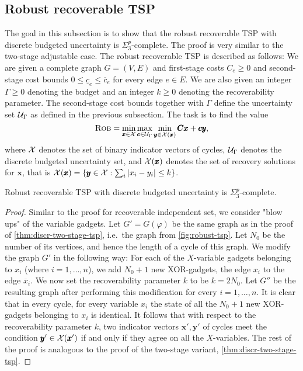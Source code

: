 \subsection{Robust recoverable TSP}
\label{subsec:rec-tsp}

The goal in this subsection is to show that the robust recoverable TSP with discrete budgeted uncertainty is $\Sigma_3^p$-complete. 
The proof is very similar to the two-stage adjustable case. 
The robust recoverable TSP is described as follows: 
We are given a complete graph $G = (V,E)$ and first-stage costs $C_e \geq 0$ and second-stage cost bounds $0 \leq \underline{c}_e \leq \overline{c}_e$ for every edge $e \in E$. 
We are also given an integer $\Gamma \geq 0$ denoting the budget and an integer $k \geq 0$ denoting the recoverability parameter. 
The second-stage cost bounds together with $\Gamma$ define the uncertainty set $\mathcal{U}_\Gamma$ as defined in the previous subsection.
The task is to find the value 
\begin{equation}
 \textsc{Rob} = \min_{\pmb x  \in \mathcal{X}} \max_{\pmb c \in \mathcal{U}_\Gamma } \min_{\pmb y \in \mathcal{X}(\pmb x) } \pmb C \pmb x + \pmb c \pmb y, \label{eq:recoverable-tsp}
 \end{equation}
where $\mathcal{X}$ denotes the set of binary indicator vectors of  cycles, $\mathcal{U}_\Gamma$ denotes the discrete budgeted uncertainty set, and $\mathcal{X}(\pmb x)$ denotes the set of recovery solutions for $\pmb x$, that is $\mathcal{X}(\pmb x) = \{ \pmb y \in \mathcal{X} : \sum_i |x_i - y_i| \leq k \}$.


\begin{theorem}
\label{thm:recoverable-tsp}
Robust recoverable TSP with discrete budgeted uncertainty is $\Sigma_3^p$-complete.
\end{theorem}

\begin{proof}
Similar to the proof for recoverable independent set, we consider "blow ups" of the variable gadgets. 
Let $G' = G(\varphi)$ be the same graph as in the proof of \cref{thm:discr-two-stage-tsp}, i.e.\ the graph from \cref{fig:robust-tsp}. 
Let $N_0$ be the number of its vertices, and hence the length of a  cycle of this graph. We modify the graph $G'$ in the following way:
For each of the $X$-variable gadgets belonging to $x_i$ (where $i = 1,\dots,n$), we add $N_0 + 1$ new XOR-gadgets,  the edge $x_i$ to the edge $\overline x_i$.
We now set the recoverability parameter $k$ to be $k = 2N_0$. Let $G''$ be the resulting graph after performing this modification for every $i=1,\dots,n$.  
It is clear that in every  cycle, for every variable $x_i$ the state of all the $N_0 + 1$ new XOR-gadgets belonging to $x_i$ is identical.
It follows that with respect to the recoverability parameter $k$, two indicator vectors $\pmb x', \pmb y'$ of  cycles meet the condition $\pmb y' \in \mathcal{X}(\pmb x')$ if and only if they agree on all the $X$-variables.
The rest of the proof is analogous to the proof of the two-stage variant,  \cref{thm:discr-two-stage-tsp}.
\end{proof}

